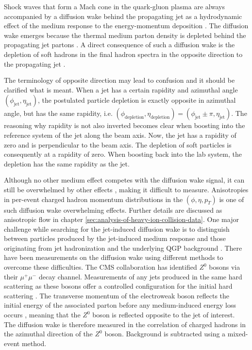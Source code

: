 \documentclass[
  a4paper,
  12pt,
  oneside,
  parskip=half,
  listof=totoc,
  bibliography=totoc,
  DIV=12,
  numbers=noenddot,
  BA.tex
  ]{subfiles}
\begin{document}
Shock waves that form a Mach cone in the quark-gluon plasma are always accompanied by a diffusion wake behind the propagating jet as a hydrodynamic effect of the medium response to the energy-momentum deposition \cite{neufeld_mach_2009} \cite{ke_qgp_2021}. The diffusion wake emerges because the thermal medium parton density is depleted behind the propagating jet partons \cite{he_linear_2015}. A direct consequence of such a diffusion wake is the depletion of soft hadrons in the final hadron spectra in the opposite direction to the propagating jet \cite{chen_search_2021}.

The terminology of opposite direction may lead to confusion and it should be clarified what is meant. When a jet has a certain rapidity and azimuthal angle $(\phi_\text{jet}, \eta_\text{jet})$, the postulated particle depletion is exactly opposite in azimuthal angle, but has the same rapidity, i.e. $(\phi_\text{depletion}, \eta_\text{depletion}) = (\phi_\text{jet} \pm \pi, \eta_\text{jet})$. The reasoning why rapidity is not also inverted becomes clear when boosting into the reference system of the jet along the beam axis. Now, the jet has a rapidity of zero and is perpendicular to the beam axis. The depletion of soft particles is consequently at a rapidity of zero. When boosting back into the lab system, the depletion has the same rapidity as the jet.

Although no other medium effect competes with the diffusion wake signal, it can still be overwhelmed by other effects \cite{chen_effects_2018}\cite{collaboration_using_2022}\cite{chen_search_2021}, making it difficult to measure. Anisotropies in per-event charged hadron momentum distributions in the $(\phi, \eta, p_T)$ is one of such diffusion wake overwhelming effects. Further details are discussed as anisotropic flow in chapter \ref{sec:analysis-of-heavy-ion-collision-data}. One major challenge while searching for the jet-induced diffusion wake is to distinguish between particles produced by the jet-induced medium response and those originating from jet hadronization and the underlying QGP background \cite{yang_background-free_2025}. There have been measurements on the diffusion wake using different methods to overcome these difficulties. The CMS collaboration \cite{collaboration_evidence_2026} has identified $Z^0$ bosons via their $\mu^+ \mu^-$ decay channel. Measurements of any jets produced in the same hard scattering as these bosons offer a controlled configuration for the initial hard scattering \cite{brewer_disentangling_2022} \cite{wang_study_1997} \cite{wang_jet_1996} \cite{kartvelishvili_z_1995}. The transverse momentum of the electroweak boson reflects the initial energy of the associated parton before any medium-induced energy loss occurs \cite{kang_vector_2017} \cite{dai_momentum_2013}, meaning that the $Z^0$ boson is reflected opposite to the jet of interest. The diffusion wake is therefore measured in the correlation of charged hadrons in the azimuthal direction of the $Z^0$ boson. Background is subtracted using a mixed-event method.
\end{document}
